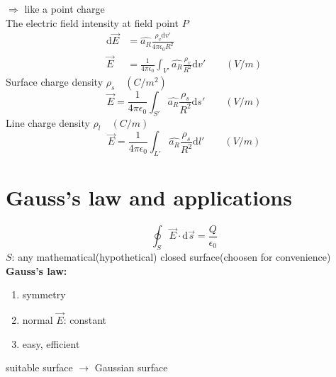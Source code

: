 \documentclass[12pt, a4paper]{article}
\begin{document}
$\Rightarrow$ like a point charge \\
The electric field intensity at field point $P$
\begin{align*}
	\text{d} \vec{E} &= \hat{a_R} \frac{\rho_v \text{d} v'}{4 \pi \epsilon_0 R^2} \\
	\vec{E} &= \frac{1}{4 \pi \epsilon_0} \int_{V'} \hat{a_R} \frac{\rho_v}{R^2} \text{d} v' \qquad(V/m)
\end{align*}
Surface charge density $\rho_s \quad(C/m^2)$\\
$$
\vec{E} = \frac{1}{4 \pi \epsilon_0} \int_{S'} \hat{a_R} \frac{\rho_s}{R^2} \text{d} s' \qquad (V/m)
$$
Line charge density $\rho_l \quad(C/m)$
$$
\vec{E} = \frac{1}{4 \pi \epsilon_0} \int_{L'} \hat{a_R} \frac{\rho_s}{R^2} \text{d} l' \qquad (V/m)
$$
\newpage

\section*{Gauss's law and applications}
$$
\oint_S \vec{E} \cdot \text{d} \vec{s} = \frac{Q}{\epsilon_0}
$$
$S$: any mathematical(hypothetical) closed surface(choosen for convenience) \\
\textbf{Gauss's law:} \\
\begin{enumerate}[label=\textcircled{\arabic*}]
	\item symmetry
	\item normal $\vec{E}$: constant
	\item easy, efficient
\end{enumerate}
suitable surface $\to$ Gaussian surface
\end{document}
